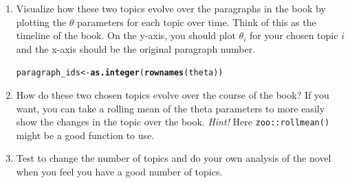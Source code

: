 \documentclass[11pt,a4paper,english]{article}\usepackage[]{graphicx}\usepackage[]{xcolor}
\makeatletter
\newcommand{\hlnum}[1]{\textcolor[rgb]{0.686,0.059,0.569}{#1}}%
\newcommand{\hldef}[1]{\textcolor[rgb]{0.345,0.345,0.345}{#1}}%
\newcommand{\hlkwb}[1]{\textcolor[rgb]{0.69,0.353,0.396}{#1}}%
\newcommand{\hlkwd}[1]{\textcolor[rgb]{0.737,0.353,0.396}{\textbf{#1}}}%
\newenvironment{kframe}{%
 \def\at@end@of@kframe{}%
 \ifinner\ifhmode%
  \def\at@end@of@kframe{\end{minipage}}%
  \begin{minipage}{\columnwidth}%
 \fi\fi%
 \def\FrameCommand##1{\hskip\@totalleftmargin \hskip-\fboxsep
 \colorbox{shadecolor}{##1}\hskip-\fboxsep
     \hskip-\linewidth \hskip-\@totalleftmargin \hskip\columnwidth}%
 \MakeFramed {\advance\hsize-\width
   \@totalleftmargin\z@ \linewidth\hsize
   \@setminipage}}%
 {\par\unskip\endMakeFramed%
 \at@end@of@kframe}
\newenvironment{knitrout}{}{} %
\makeatother
\begin{document}
\begin{enumerate}
\begin{knitrout}
\begin{kframe}
\begin{alltt}
\hldef{top_words} \hlkwb{<-} \hlkwd{terms}\hldef{(lda_fit,} \hlnum{20}\hldef{)}
\hldef{top_words}
\end{alltt}
\end{kframe}
\end{knitrout}
\item Visualize how these two topics evolve over the paragraphs in the book by plotting the $\theta$ parameters for each topic over time. Think of this as the timeline of the book. On the y-axis, you should plot $\theta_i$ for your chosen topic $i$ and the x-axis should be the original paragraph number.
\begin{knitrout}\small
{}\color{fgcolor}\begin{kframe}
\begin{alltt}
\hldef{paragraph_ids} \hlkwb{<-} \hlkwd{as.integer}\hldef{(}\hlkwd{rownames}\hldef{(theta))}
\end{alltt}
\end{kframe}
\end{knitrout}
\item How do these two chosen topics evolve over the course of the book? If you want, you can take a rolling mean of the theta parameters to more easily show the changes in the topic over the book. \emph{Hint!} Here \texttt{zoo::rollmean()} might be a good function to use.
\item Test to change the number of topics and do your own analysis of the novel when you feel you have a good number of topics.

\end{enumerate}


\end{document}
